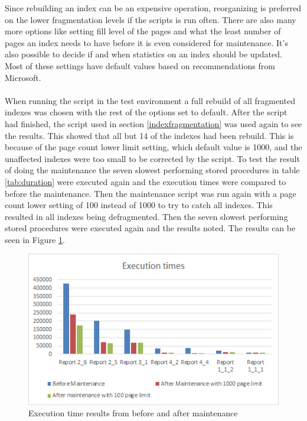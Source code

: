 \documentclass{cslthse-msc}
\begin{document}
Since rebuilding an index can be an expensive operation, reorganizing is preferred on the lower fragmentation levels if the scripts is run often. There are also many more options like setting fill level of the pages and what the least number of pages an index needs to have before it is even considered for maintenance. It's also possible to decide if and when statistics on an index should be updated. Most of these settings have default values based on recommendations from Microsoft.\\\\
When running the script in the test environment a full rebuild of all fragmented indexes was chosen with the rest of the options set to default. After the script had finished, the script used in section \ref{indexfragmentation} was used again to see the results. This showed that all but 14 of the indexes had been rebuild. This is because of the page count lower limit setting, which default value is 1000, and the unaffected indexes were too small to be corrected by the script. To test the result of doing the maintenance the seven slowest performing stored procedures in table \ref{tab:duration} were executed again and the execution times were compared to before the maintenance. Then the maintenance script was run again with a page count lower setting of 100 instead of 1000 to try to catch all indexes. This resulted in all indexes being defragmented. Then the seven slowest performing stored procedures were executed again and the results noted. The results can be seen in Figure \ref{fig:beforeafter}.

\begin{figure}[H]
\begin{center}
\includegraphics[scale=1]{Pictures/beforeAndAfterMaintenance.png}
\caption{Execution time results from before and after maintenance}
\label{fig:beforeafter}
\end{center}
\end{figure} 
\end{document}
